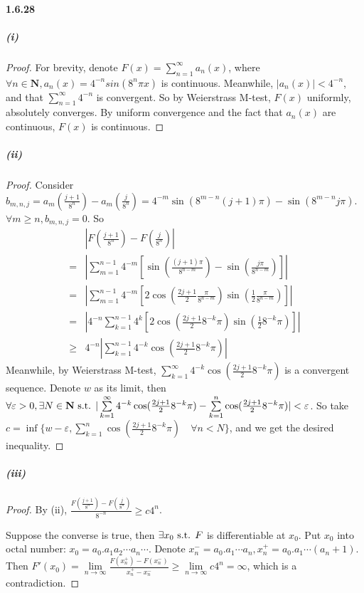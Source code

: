 \documentclass{article}
\begin{document}
\paragraph{1.6.28}
\subparagraph{(i)}
\begin{proof}
For brevity, denote $F(x)=\sum\limits_{n=1}^\infty a_n(x)$, where $\forall n\in \mathbf{N},a_n(x)=4^{-n}sin(8^n\pi x)$ is continuous. Meanwhile, $|a_n(x)|<4^{-n}$, and that $\sum\limits_{n=1}^\infty 4^{-n}$ is convergent. So by Weierstrass M-test, $F(x)$ uniformly, absolutely converges. By uniform convergence and the fact that $a_n(x)$ are continuous, $F(x)$ is continuous.
\end{proof}
\subparagraph{(ii)}
\begin{proof}
Consider $b_{m,n,j}=a_m(\frac{j+1}{8^n})-a_m(\frac{j}{8^n})=4^{-m}\sin(8^{m-n}(j+1)\pi )-\sin(8^{m-n}j\pi)$. $\forall m\geq n, b_{m,n,j}=0$. So 
\[\begin{aligned}
&|F(\frac{j+1}{8^n})-F(\frac{j}{8^n})|\\
=&|\sum\limits_{m=1}^{n-1}4^{-m}[\sin(\frac{(j+1)\pi}{8^{n-m}})-\sin(\frac{j\pi}{8^{n-m}})]|\\
=&|\sum\limits_{m=1}^{n-1}4^{-m}[2\cos(\frac{2j+1}{2}\frac{\pi}{8^{n-m}})\sin(\frac{1}{2}\frac{\pi}{8^{n-m}})]|\\
=&|4^{-n}\sum_{k=1}^{n-1}4^{k}[2\cos(\frac{2j+1}{2}8^{-k}\pi)\sin(\frac{1}{2}8^{-k}\pi)]|\\
\geq&4^{-n}|\sum_{k=1}^{n-1}4^{-k}\cos(\frac{2j+1}{2}8^{-k}\pi)|
\end{aligned}\]
Meanwhile, by Weierstrass M-test, $\sum\limits_{k=1}^\infty 4^{-k}\cos(\frac{2j+1}{2}8^{-k}\pi)$ is a convergent sequence. Denote $w$ as its limit, then $\forall\varepsilon>0,\exists N\in\mathbf{N}\text{ s.t. } |\sum\limits_{k=1}^\infty 4^{-k}\cos(\frac{2j+1}{2}8^{-k}\pi)-\sum\limits_{k=1}^n \cos(\frac{2j+1}{2}8^{-k}\pi)|<\varepsilon$. So take $c=\inf\{w-\varepsilon, \sum\limits_{k=1}^n \cos(\frac{2j+1}{2}8^{-k}\pi)\quad\forall n<N\}$, and we get the desired inequality.
\end{proof}
\subparagraph{(iii)}
\begin{proof}
By (ii), $\frac{F(\frac{j+1}{8^n})-F(\frac{j}{8^n})}{8^{-n}}\geq c4^n$.

Suppose the converse is true, then $\exists x_0\text{ s.t. } F$ is differentiable at $x_0$. Put $x_0$ into octal number: $x_0=a_0.a_1a_2\cdots a_n\cdots$. Denote $x^-_n=a_0.a_1\cdots a_n,x^+_n=a_0.a_1\cdots (a_n+1)$. Then $F'(x_0)=\lim\limits_{n\to\infty}\frac{F(x_n^+)-F(x_n^-)}{x_n^+-x_n^-}\geq\lim\limits_{n\to\infty}c4^n=\infty$, which is a contradiction.
\end{proof}
\end{document}

